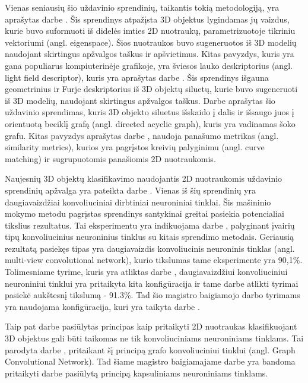 Vienas seniausių šio uždavinio sprendinių, taikantis tokią metodologiją, yra aprašytas darbe \cite{prevWparEig}. Šis sprendinys atpažįsta 3D objektus lygindamas jų vaizdus, kurie buvo suformuoti iš didelės imties 2D nuotraukų, parametrizuotoje tikriniu vektoriumi (angl. eigenspace). Šios nuotraukos buvo sugeneruotos iš 3D modelių naudojant skirtingus apžvalgos taškus ir apšvietimus. Kitas pavyzdys, kuris yra gana populiarus kompiuterinėje grafikoje, yra šviesos lauko deskriptorius (angl. light field descriptor), kuris yra aprašytas darbe \cite{prevWLightFld}. Šis sprendinys išgauna geometrinius ir Furje deskriptorius iš 3D objektų siluetų, kurie buvo sugeneruoti iš 3D modelių, naudojant skirtingus apžvalgos taškus. Darbe \cite{prevWShockGraph} aprašytas šio uždavinio sprendimas, kuris 3D objekto siluetus išskaido į dalis ir išsaugo juos į orientuotą beciklį grafą (angl. directed acyclic graph), kuris yra vadinamas šoko grafu. Kitas pavyzdys aprašytas darbe \cite{prevWSimMet}, naudoja panašumo metrikas (angl. similarity metrics), kurios yra pagrįstos kreivių palyginimu (angl. curve matching) ir sugrupuotomis panašiomis 2D nuotraukomis.

Naujesnių 3D objektų klasifikavimo naudojantis 2D nuotraukomis uždavinio sprendinių apžvalga yra pateikta darbe \cite{survey}. Vienas iš šių sprendinių yra daugiavaizdžiai konvoliuciniai dirbtiniai neuroniniai tinklai. Šis mašininio mokymo metodu pagrįstas sprendinys santykinai greitai pasiekia potencialiai tikslius rezultatus. Tai eksperimentu yra indikuojama darbe \cite{cnnExp1}, palyginant įvairių tipų konvoliucinius neuroninius tinklus su kitais sprendimo metodais. Geriausią rezultatą pasiekęs tipas yra daugiavaizdis konvoliucinis neuroninis tinklas (angl. multi-view convolutional network), kurio tikslumas tame eksperimente yra 90,1\%. Tolimesniame tyrime, kuris yra atliktas darbe \cite{cnnExp2}, daugiavaizdžiui konvoliuciniui neuroniniui tinklui yra pritaikyta kita konfigūracija ir tame darbe atlikti tyrimai pasiekė aukštesnį tikslumą - 91.3\%. Tad šio magistro baigiamojo darbo tyrimams yra naudojama konfigūracija, kuri yra taikyta darbe \cite{cnnExp2}.

Taip pat darbe \cite{cnnExp1} pasiūlytas principas kaip pritaikyti 2D nuotraukas klasifikuojant 3D objektus gali būti taikomas ne tik konvoliuciniams neuroniniams tinklams. Tai parodyta darbe \cite{MVGCN}, pritaikant šį principą grafo konvoliuciniui tinklui (angl. Graph Convolutional Network). Tad šiame magistro baigiamajame darbe yra bandoma pritaikyti darbe \cite{cnnExp1} pasiūlytą principą kapsuliniams neuroniniams tinklams.